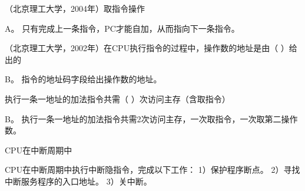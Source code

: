 \question （北京理工大学，2004年）取指令操作
\par{}
\begin{solution}A。 只有完成上一条指令，PC才能自加，从而指向下一条指令。
\end{solution}
\question （北京理工大学，2002年）在CPU执行指令的过程中，操作数的地址是由（
）给出的
\par{}
\begin{solution}B。 指令的地址码字段给出操作数的地址。
\end{solution}
\question 执行一条一地址的加法指令共需（ ）次访问主存（含取指令）
\par{}
\begin{solution}B。
执行一条一地址的加法指令共需2次访问主存，一次取指令，一次取第二操作数。
\end{solution}
\question CPU在中断周期中
\par{}
\begin{solution}CPU在中断周期中执行中断隐指令，完成以下工作： 1）保护程序断点。
2）寻找中断服务程序的入口地址。 3）关中断。
\end{solution}
